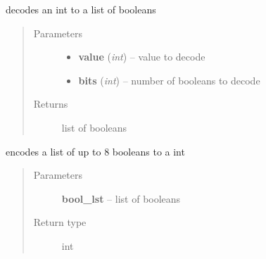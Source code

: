 \documentclass[letterpaper,10pt,english]{sphinxmanual}
\begin{document}

\begin{fulllineitems}
\label{libraries:libraries.can._decode_booleans}
decodes an int to a list of booleans
\begin{quote}\begin{description}
\item[{Parameters}] \leavevmode\begin{itemize}
\item {} 
\textbf{value} (\emph{int}) -- value to decode

\item {} 
\textbf{bits} (\emph{int}) -- number of booleans to decode

\end{itemize}

\item[{Returns}] \leavevmode
list of booleans

\end{description}\end{quote}

\end{fulllineitems}


\begin{fulllineitems}
\label{libraries:libraries.can._encode_booleans}
encodes a list of up to 8 booleans to a int
\begin{quote}\begin{description}
\item[{Parameters}] \leavevmode
\textbf{bool\_lst} -- list of booleans

\item[{Return type}] \leavevmode
int

\end{description}\end{quote}

\end{fulllineitems}

\end{document}
